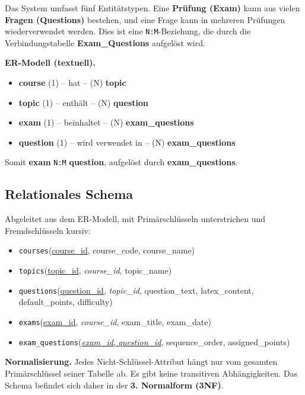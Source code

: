 \documentclass[11pt,a4paper]{article}
\begin{document}
Das System umfasst fünf Entitätstypen. Eine \textbf{Prüfung (Exam)} kann aus vielen \textbf{Fragen (Questions)} bestehen, und eine Frage kann in mehreren Prüfungen wiederverwendet werden. Dies ist eine \texttt{N:M}-Beziehung, die durch die Verbindungstabelle \textbf{Exam\_Questions} aufgelöst wird.

\begin{beispielbox}
\textbf{ER-Modell (textuell).}
\begin{itemize}[leftmargin=1.4em, topsep=2pt]
  \item \textbf{course} (1) \;--\; hat \;--\; (N) \textbf{topic}
  \item \textbf{topic} (1) \;--\; enthält \;--\; (N) \textbf{question}
  \item \textbf{exam} (1) \;--\; beinhaltet \;--\; (N) \textbf{exam\_questions}
  \item \textbf{question} (1) \;--\; wird verwendet in \;--\; (N) \textbf{exam\_questions}
\end{itemize}
Somit \textbf{exam} \texttt{N:M} \textbf{question}, aufgelöst durch \textbf{exam\_questions}.
\end{beispielbox}

\subsection{Relationales Schema}

Abgeleitet aus dem ER-Modell, mit Primärschlüsseln unterstrichen und Fremdschlüsseln kursiv:

\begin{itemize}[leftmargin=1.4em]
  \item \texttt{courses}(\underline{course\_id}, course\_code, course\_name)
  \item \texttt{topics}(\underline{topic\_id}, \emph{course\_id}, topic\_name)
  \item \texttt{questions}(\underline{question\_id}, \emph{topic\_id}, question\_text, latex\_content, default\_points, difficulty)
  \item \texttt{exams}(\underline{exam\_id}, \emph{course\_id}, exam\_title, exam\_date)
  \item \texttt{exam\_questions}(\underline{\emph{exam\_id}, \emph{question\_id}}, sequence\_order, assigned\_points)
\end{itemize}

\textbf{Normalisierung.} Jedes Nicht-Schlüssel-Attribut hängt nur vom gesamten Primärschlüssel seiner Tabelle ab. Es gibt keine transitiven Abhängigkeiten. Das Schema befindet sich daher in der \textbf{3. Normalform (3NF)}.
\end{document}
